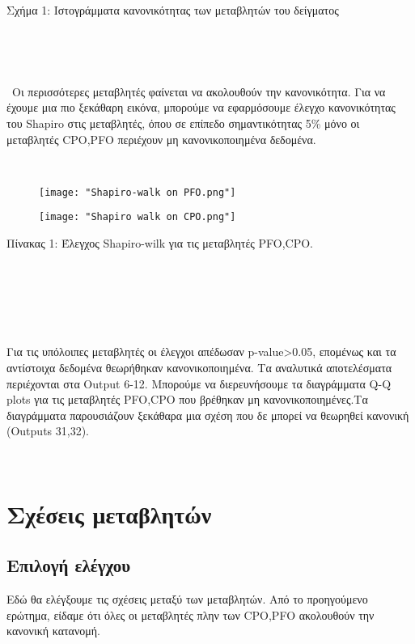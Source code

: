 \documentclass[10pt]{article}
\begin{document}
\begin{centering}

\renewcommand{\caption}{Σχήμα 1: }
\caption{Ιστογράμματα κανονικότητας των μεταβλητών του δείγματος}
\end{centering}
\

\
    


\
Οι περισσότερες μεταβλητές φαίνεται να ακολουθούν την κανονικότητα. Για να έχουμε μια πιο ξεκάθαρη εικόνα, μπορούμε να εφαρμόσουμε έλεγχο κανονικότητας του Shapiro στις μεταβλητές, όπου σε επίπεδο σημαντικότητας 5\% μόνο οι μεταβλητές CPO,PFO περιέχουν μη κανονικοποιημένα δεδομένα.
\

\
\begin{figure}[H]
    \centering
    \texttt{[image: "Shapiro-walk on PFO.png"]}
    
    \label{fig:galaxy}
\end{figure}

\begin{figure}[H]
    \centering
    \texttt{[image: "Shapiro walk on CPO.png"]}
    
    \label{fig:galaxy}
\end{figure}

\begin{centering}

\renewcommand{\caption}{Πίνακας 1: }
\caption {Έλεγχος Shapiro-wilk για τις μεταβλητές PFO,CPO. }
\end{centering}
\

\

\

Για τις υπόλοιπες μεταβλητές οι έλεγχοι απέδωσαν p-value>0.05, επομένως και τα αντίστοιχα δεδομένα θεωρήθηκαν κανονικοποιημένα. Τα αναλυτικά αποτελέσματα περιέχονται στα Output 6-12.
Μπορούμε να διερευνήσουμε τα διαγράμματα Q-Q plots για τις μεταβλητές PFO,CPO που βρέθηκαν μη κανονικοποιημένες.Τα διαγράμματα παρουσιάζουν ξεκάθαρα μια σχέση που δε μπορεί να θεωρηθεί κανονική (Outputs 31,32).
\

\
\section{ Σχέσεις μεταβλητών}

\subsection { Επιλογή ελέγχου}
Εδώ θα ελέγξουμε τις σχέσεις μεταξύ των μεταβλητών. Από το προηγούμενο ερώτημα, είδαμε ότι όλες οι μεταβλητές πλην των CPO,PFO ακολουθούν την κανονική κατανομή.
\end{document}
